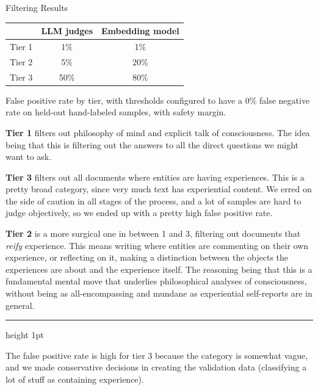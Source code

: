 \documentclass[final]{beamer}
\begin{document}
\begin{frame}[t]
\begin{minipage}[t][\colheight][s]{0.32\linewidth}
\end{minipage}
\hfill
\begin{minipage}[t][\colheight][s]{0.32\linewidth}

    \begin{block}{Filtering Results}
      \begin{center}
      \begin{tabular}{lcc}
        \toprule
        & \textbf{LLM judges} & \textbf{Embedding model} \\
        \midrule
        Tier 1 & 1\%  & 1\%  \\
        Tier 2 & 5\%  & 20\% \\
        Tier 3 & 50\% & 80\% \\
        \bottomrule
      \end{tabular}
      \par\smallskip
      \parbox{0.85\linewidth}{\centering\footnotesize False positive rate by
       tier, with thresholds configured to have a 0\% false negative rate on
       held-out hand-labeled samples, with safety margin.}
      \end{center}

      \medskip
      \small
      \textbf{Tier 1} filters out philosophy of mind and explicit talk of
      consciousness. The idea being that this is filtering out the answers to
      all the direct questions we might want to ask.

      \medskip
      \textbf{Tier 3} filters out all documents where entities are having
      experiences. This is a pretty broad category, since very much text has
      experiential content. We erred on the side of caution in all stages of
      the process, and a lot of samples are hard to judge objectively, so we
      ended up with a pretty high false positive rate.

      \medskip
      \textbf{Tier 2} is a more surgical one in between 1 and 3, filtering
      out documents that \emph{reify} experience. This means writing where
      entities are commenting on their own experience, or reflecting on it,
      making a distinction between the objects the experiences are about and
      the experience itself. The reasoning being that this is a fundamental
      mental move that underlies philosophical analyses of consciousness,
      without being as all-encompassing and mundane as experiential
      self-reports are in general.

      \medskip
      {\color{accent!40}\hrule height 1pt}
      \medskip
      The false positive rate is high for tier 3 because the category is
      somewhat vague, and we made conservative decisions in creating the
      validation data (classifying a lot of stuff as containing experience).
    \end{block}
\vfill


\end{minipage}
\end{frame}
\end{document}
